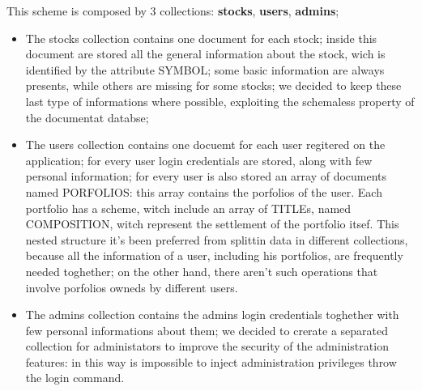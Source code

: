 This scheme is composed by 3 collections: \textbf{stocks}, \textbf{users}, \textbf{admins};
\begin{itemize}
    \item
The stocks collection contains one document for each stock; inside this document are stored 
all the general information about the stock, wich is identified by the attribute SYMBOL;
some basic information are always presents, while others are missing for some stocks; we decided 
to keep these last type of informations where possible, exploiting the schemaless property of
the documentat databse;
    \item
The users collection contains one docuemt for each user regitered on the application; for every
user login credentials are stored, along with few personal information; for every user is 
also stored an array of documents named PORFOLIOS: this array contains the porfolios of the user.
Each portfolio has a scheme, witch include an array of TITLEs, named COMPOSITION, witch represent
the settlement of the portfolio itsef. This nested structure it's been preferred from splittin
data in different collections, because all the information of a user, including his portfolios, 
are frequently needed toghether; on the other hand, there aren't such operations that involve
porfolios owneds by different users.
    \item 
The admins collection contains the admins login credentials toghether with few personal
informations about them; we decided to crerate a separated collection for administators 
to improve the security of the administration features: in this way is impossible to inject
administration privileges throw the login command.
\end{itemize}
